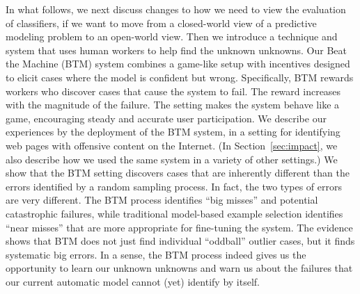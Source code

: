 In what follows, we next discuss
changes to how we need to view the evaluation of classifiers, if we
want to move from a closed-world view of a predictive modeling problem
to an open-world view.  Then we introduce a technique and system that uses
human workers to help find the unknown unknowns.  Our
Beat the Machine (BTM) system combines a game-like setup with incentives
designed to elicit cases where the model is confident but wrong.
Specifically, BTM rewards workers who discover cases that cause the
system to fail. The reward increases with the magnitude of the
failure. The setting makes the system behave like a game,
encouraging steady and accurate user participation. We describe
our experiences by the deployment of the BTM system, in a
setting for identifying web pages with offensive content on the
Internet. (In Section~\ref{sec:impact}, we also describe how we used the same
system in a variety of other settings.) We show that the BTM setting discovers cases that are
inherently different than the errors identified by a random sampling
process. In fact, the two types of errors are very different. The BTM
process identifies ``big misses'' and potential catastrophic failures,
while traditional model-based example selection identifies ``near
misses'' that are more appropriate for fine-tuning the system.  The
evidence shows that BTM does not just find individual ``oddball''
outlier cases, but it finds systematic big errors.  In a sense, the
BTM process indeed gives us the opportunity to learn our unknown
unknowns and warn us about the failures that our current automatic
model cannot (yet) identify by itself.



